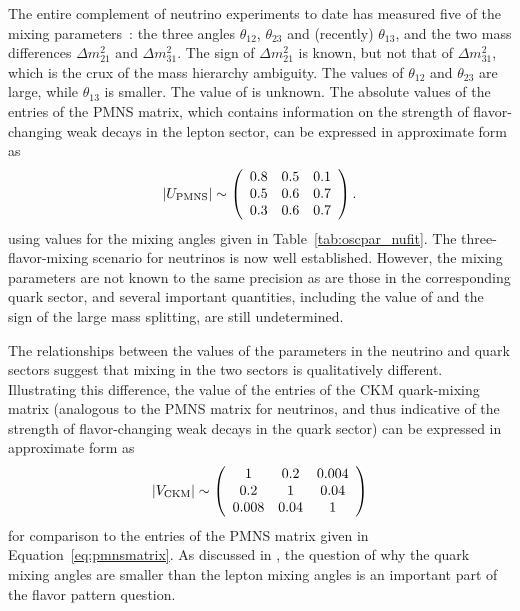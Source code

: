 The entire complement of neutrino experiments to date has measured
five of the mixing parameters~\cite{Gonzalez-Garcia:2014bfa,Capozzi:2013csa,Forero:2014bxa}: the three angles $\theta_{12}$,
$\theta_{23}$ and (recently) $\theta_{13}$, and the two mass differences
$\Delta m^{2}_{21}$ and $\Delta m^{2}_{31}$. The sign of $\Delta
m^{2}_{21}$ is known, but not that of $\Delta m^{2}_{31}$, which 
is the crux of the 
mass hierarchy ambiguity.
The values of $\theta_{12}$ and $\theta_{23}$ are large, while 
$\theta_{13}$ is smaller. The value of \deltacp is unknown.
The absolute values of the entries of the PMNS matrix, which
contains information on the strength of flavor-changing weak decays in
the lepton sector, can be expressed in approximate form as
\begin{equation}
|U_{\rm PMNS}|\sim \left(\begin{array}{ccc} 0.8 & 0.5 & 0.1 \\ 0.5 & 0.6 & 0.7 \\ 0.3 & 0.6 & 0.7\end{array} \right).
\label{eq:pmnsmatrix}
\end{equation}
using values for the mixing angles given in Table~\ref{tab:oscpar_nufit}.
The three-flavor-mixing scenario for neutrinos is now well
established. However, the mixing parameters are not known to the same precision 
as are those in the
corresponding quark sector, and several important quantities, including
the value of \deltacp and the sign of the large mass splitting, are
still undetermined. 

The relationships between the values of the parameters in the neutrino
and quark sectors suggest that mixing in the two sectors is
qualitatively different. Illustrating this difference, the value of
the entries of the CKM quark-mixing matrix (analogous to the PMNS matrix for
neutrinos, and thus indicative of the strength of flavor-changing weak
decays in the quark sector) can be expressed in approximate form as
\begin{equation}
|V_{\rm CKM}|\sim \left(\begin{array}{ccc} 1 & 0.2 & 0.004\\ 0.2 & 1 & 0.04 \\ 0.008 & 0.04 & 1\end{array} \right)
\label{eq:ckmmatrix}
\end{equation}
for comparison to the entries of the PMNS matrix given in Equation~\ref{eq:pmnsmatrix}.
As discussed in \cite{King:2014nza}, the question of why the quark mixing angles are
smaller than the lepton mixing angles is an important part of the %
flavor pattern question. 

